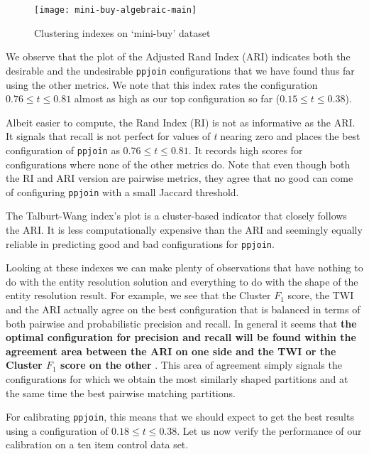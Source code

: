 \begin{figure}[htbp]
    \centering
    \captionsetup{justification=centering}
    \texttt{[image: mini-buy-algebraic-main]}
    \caption{Clustering indexes on `mini-buy' dataset}\label{fig:mini-alg}
\end{figure}

We observe that the plot of the Adjusted Rand Index (ARI) indicates both the
desirable and the undesirable \texttt{ppjoin} configurations that we have found
thus far using the other metrics.
We note that this index rates the configuration $0.76 \le t \le 0.81$ almost as
high as our top configuration so far ($0.15 \le t \le 0.38$).

Albeit easier to compute, the Rand Index (RI) is not as informative as the ARI.
It signals that recall is not perfect for values of \textit{t} nearing zero and
places the best configuration of \texttt{ppjoin} as $0.76 \le t \le 0.81$.
It records high scores for configurations where none of the other metrics do.
Note that even though both the RI and ARI version are pairwise metrics, they
agree that no good can come of configuring \texttt{ppjoin} with a small Jaccard
threshold.

The Talburt-Wang index's plot is a cluster-based indicator that closely follows
the ARI.
It is less computationally expensive than the ARI and seemingly equally reliable
in predicting good and bad configurations for \texttt{ppjoin}.

Looking at these indexes we can make plenty of observations that have nothing to
do with the entity resolution solution and everything to do with the shape of
the entity resolution result.
For example, we see that the Cluster $F_1$ score, the TWI and the ARI actually
agree on the best configuration that is balanced in terms of both pairwise and
probabilistic precision and recall.
In general it seems that \textbf{
    the optimal configuration for precision and recall will be found within the
    agreement area between the ARI on one side and the TWI or the Cluster $F_1$
    score on the other
}.
This area of agreement simply signals the configurations for which we obtain
the most similarly shaped partitions and at the same time the best pairwise
matching partitions.

For calibrating \texttt{ppjoin}, this means that we should expect to get the
best results using a configuration of $0.18 \le t \le 0.38$.
Let us now verify the performance of our calibration on a ten item control data
set.

